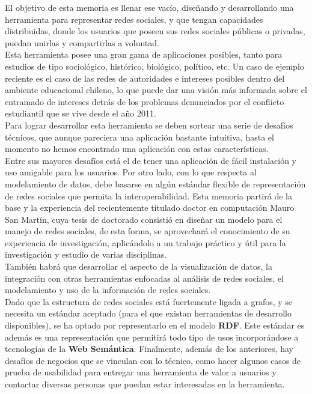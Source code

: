 \begin{intro}
  El objetivo de esta memoria es llenar ese vacío, diseñando y desarrollando una herramienta para representar redes sociales, y que tengan capacidades distribuidas, donde los usuarios que poseen sus redes sociales públicas o privadas, puedan unirlas y compartirlas a voluntad.\\

  Esta herramienta posee una gran gama de aplicaciones posibles, tanto para estudios de tipo sociológico, histórico, biológico, político, etc. Un caso de ejemplo reciente es el caso de las redes de autoridades e intereses posibles dentro del ambiente educacional chileno, lo que puede dar una visión más informada sobre el entramado de intereses detrás de los problemas denunciados por el conflicto estudiantil que se vive desde el año 2011.\\

  Para lograr desarrollar esta herramienta se deben sortear una serie de desafíos técnicos, que aunque pareciera una aplicación bastante intuitiva, hasta el momento no hemos encontrado una aplicación con estas características.\\

  Entre sus mayores desafíos está el de tener una aplicación de fácil instalación y uso amigable para los usuarios. Por otro lado, con lo que respecta al modelamiento de datos, debe basarse en algún estándar flexible de representación de redes sociales que permita la interoperabilidad. Esta memoria partirá de la base y la experiencia del recientemente titulado doctor en computación Mauro San Martín, cuya tesis de doctorado consistió en diseñar un modelo para el manejo de redes sociales, de esta forma, se aprovechará el conocimiento de su experiencia de investigación, aplicándolo a un trabajo práctico y útil para la investigación y estudio de varias disciplinas.\\

  También habrá que desarrollar el aspecto de la visualización de datos, la integración con otras herramientas enfocadas al análisis de redes sociales, el modelamiento y uso de la información de redes sociales.\\

  Dado que la estructura de redes sociales está fuertemente ligada a grafos, y se necesita un estándar aceptado (para el que existan herramientas de desarrollo disponibles), se ha optado por representarlo en el modelo \textbf{RDF}. Este estándar es además es una representación que permitirá todo tipo de usos incorporándose a tecnologías de la \textbf{Web Semántica}. Finalmente, además de los anteriores, hay desafíos de negocios que se vinculan con lo técnico, como hacer algunos casos de prueba de usabilidad para entregar una herramienta de valor a usuarios y contactar diversas personas que puedan estar interesadas en la herramienta.\\


\end{intro}
